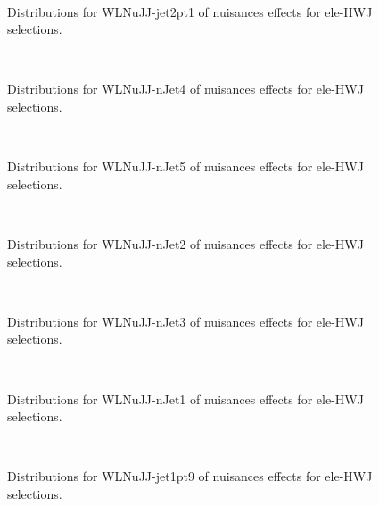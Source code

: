 \begin{figure}[htbp]  
\centering 
\\ 
\caption{ 
   Distributions for WLNuJJ-jet2pt1 of nuisances effects for ele-HWJ selections.
} 
\label{fig:WLNuJJ_jet2pt1_ele_HWJ} 
\end{figure} 




\begin{figure}[htbp]  
\centering 
\\ 
\caption{ 
   Distributions for WLNuJJ-nJet4 of nuisances effects for ele-HWJ selections.
} 
\label{fig:WLNuJJ_nJet4_ele_HWJ} 
\end{figure} 




\begin{figure}[htbp]  
\centering 
\\ 
\caption{ 
   Distributions for WLNuJJ-nJet5 of nuisances effects for ele-HWJ selections.
} 
\label{fig:WLNuJJ_nJet5_ele_HWJ} 
\end{figure} 




\begin{figure}[htbp]  
\centering 
\\ 
\caption{ 
   Distributions for WLNuJJ-nJet2 of nuisances effects for ele-HWJ selections.
} 
\label{fig:WLNuJJ_nJet2_ele_HWJ} 
\end{figure} 




\begin{figure}[htbp]  
\centering 
\\ 
\caption{ 
   Distributions for WLNuJJ-nJet3 of nuisances effects for ele-HWJ selections.
} 
\label{fig:WLNuJJ_nJet3_ele_HWJ} 
\end{figure} 




\begin{figure}[htbp]  
\centering 
\\ 
\caption{ 
   Distributions for WLNuJJ-nJet1 of nuisances effects for ele-HWJ selections.
} 
\label{fig:WLNuJJ_nJet1_ele_HWJ} 
\end{figure} 




\begin{figure}[htbp]  
\centering 
\\ 
\caption{ 
   Distributions for WLNuJJ-jet1pt9 of nuisances effects for ele-HWJ selections.
} 
\label{fig:WLNuJJ_jet1pt9_ele_HWJ} 
\end{figure} 




